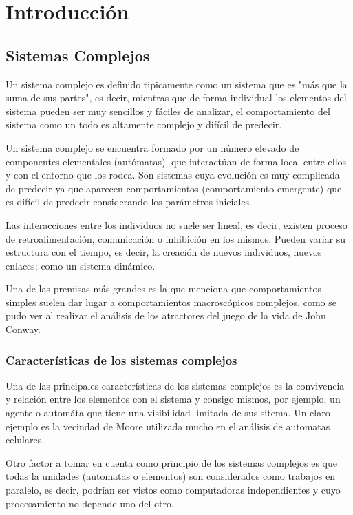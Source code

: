%
\newpage
\chapter{Introducción}
  \section{Sistemas Complejos}
      Un sistema complejo es definido tipicamente como un sistema que es "más que la suma de sus partes", es decir, mientras que de forma individual los elementos del sistema pueden ser muy sencillos y fáciles de analizar, el comportamiento del sistema como un todo es altamente complejo y difícil de predecir.\cite{3}

      Un sistema complejo se encuentra formado por un número elevado de componentes elementales (autómatas), que interactúan de forma local entre ellos y con el entorno que los rodea. Son sistemas cuya evolución es muy complicada de predecir ya que aparecen comportamientos (comportamiento emergente) que es difícil de predecir considerando los parámetros iniciales.
      
      Las interacciones entre los individuos no suele ser lineal, es decir, existen proceso de retroalimentación, comunicación o inhibición en los mismos. Pueden variar su estructura con el tiempo, es decir, la creación de nuevos individuos, nuevos enlaces; como un sistema dinámico. \cite{1}
      
      Una de las premisas más grandes es la que menciona que comportamientos simples suelen dar lugar a comportamientos macroscópicos complejos, como se pudo ver al realizar el análisis de los atractores del juego de la vida de John Conway.\cite{2}
    \subsection{Características de los sistemas complejos}
      Una de las principales características de los sistemas complejos es la convivencia y relación entre los elementos con el sistema y consigo mismos, por ejemplo, un agente o automáta que tiene una visibilidad limitada de sus sitema. Un claro ejemplo es la vecindad de Moore utilizada mucho en el análisis de automatas celulares.\cite{4}
      
      Otro factor a tomar en cuenta como principio de los sistemas complejos es que todas la unidades (automatas o elementos) son considerados como trabajos en paralelo, es decir, podrían ser vistos como computadoras independientes y cuyo procesamiento no depende uno del otro.

